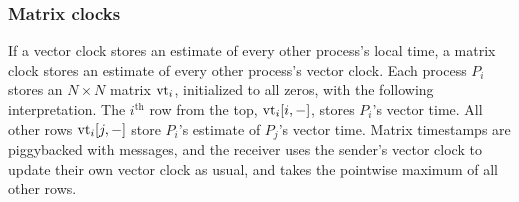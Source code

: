 \documentclass[]             %
{NASA}                       %
\theoremstyle{definition}
\begin{document}










\subsubsection{Matrix clocks}
\label{sssec:matrix-clocks}
If a vector clock stores an estimate of every other process's local
time, a matrix clock stores an estimate of every other process's
vector clock. Each process $P_i$ stores an $N\times{}N$ matrix
$\textrm{vt}_i$, initialized to all zeros, with the following
interpretation. The $i^{\textrm{th}}$ row from the top, $\textrm{vt}_i[i, -]$,
stores $P_i$'s vector time. All other rows $\textrm{vt}_i[j,-]$ store $P_i$'s
estimate of $P_j$'s vector time. Matrix timestamps are piggybacked
with messages, and the receiver uses the sender's vector clock to
update their own vector clock as usual, and takes the pointwise
maximum of all other rows.
\end{document}
